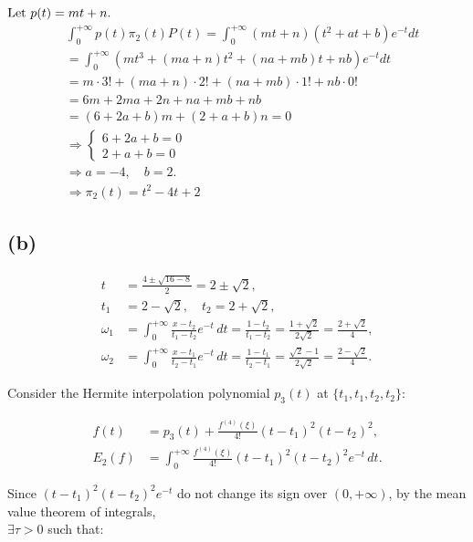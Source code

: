 \documentclass[a4paper]{article}
\begin{document}
$\text{Let } p(t) = mt + n. \\$
\begin{align*}
&\int_{0}^{+\infty} p(t) \pi_2(t) P(t) = \int_{0}^{+\infty} (mt+n)(t^2+at+b) e^{-t} dt \\
&= \int_{0}^{+\infty} (mt^3 + (ma+n)t^2 + (na+mb)t + nb) e^{-t} dt \\
&= m \cdot 3! + (ma+n) \cdot 2! + (na+mb) \cdot 1! + nb \cdot 0! \\
&= 6m + 2ma + 2n + na + mb + nb \\
&= (6 + 2a + b)m + (2 + a + b)n = 0 \\
&\Rightarrow \begin{cases}
6 + 2a + b = 0 \\
2 + a + b = 0
\end{cases} \\
&\Rightarrow a = -4, \quad b = 2. \\
&\Rightarrow \pi_2(t) = t^2 - 4t + 2
\end{align*}

\subsection*{(b)}

\begin{align*}
t &= \frac{4 \pm \sqrt{16 - 8}}{2} = 2 \pm \sqrt{2}, \\
t_1 &= 2 - \sqrt{2}, \quad t_2 = 2 + \sqrt{2}, \\
\omega_1 &= \int_0^{+\infty} \frac{x - t_2}{t_1 - t_2} e^{-t} \, dt = \frac{1 - t_2}{t_1 - t_2} = \frac{1 + \sqrt{2}}{2\sqrt{2}} = \frac{2 + \sqrt{2}}{4}, \\
\omega_2 &= \int_0^{+\infty} \frac{x - t_1}{t_2 - t_1} e^{-t} \, dt = \frac{1 - t_1}{t_2 - t_1} = \frac{\sqrt{2} - 1}{2\sqrt{2}} = \frac{2 - \sqrt{2}}{4}.
\end{align*}

Consider the Hermite interpolation polynomial \( p_3(t) \) at \( \{t_1, t_1, t_2, t_2\} \):

\begin{align*}
f(t) &= p_3(t) + \frac{f^{(4)}(\xi)}{4!} (t - t_1)^2 (t - t_2)^2, \\
E_2(f) &= \int_0^{+\infty} \frac{f^{(4)}(\xi)}{4!} (t - t_1)^2 (t - t_2)^2 e^{-t} \, dt.
\end{align*}

Since \( (t - t_1)^2 (t - t_2)^2 e^{-t} \) do not change its sign over \( (0, +\infty) \), by the mean value theorem of integrals, \\
$\exists \tau > 0$ such that:
\end{document}
